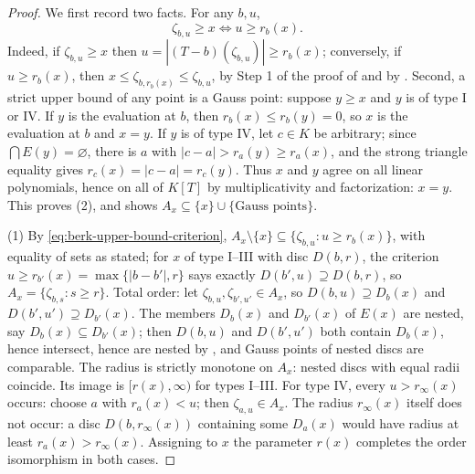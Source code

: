 \begin{proof}
We first record two facts.  For any $b,u$,
\begin{equation}
 \zeta_{b,u}\geq x
 \iff u\geq r_b(x).
 \tag{4.1}\label{eq:berk-upper-bound-criterion}
\end{equation}
Indeed, if $\zeta_{b,u}\geq x$ then
$u=|(T-b)(\zeta_{b,u})|\geq r_b(x)$; conversely, if
$u\geq r_b(x)$, then
$x\leq\zeta_{b,r_b(x)}\leq\zeta_{b,u}$, by Step 1 of the proof of
 and by
.  Second, a strict upper bound of
any point is a Gauss point: suppose $y\geq x$ and $y$ is of type I
or IV.  If $y$ is the evaluation at $b$, then
$r_b(x)\leq r_b(y)=0$, so $x$ is the evaluation at $b$ and
$x=y$.  If $y$ is of type IV, let $c\in K$ be arbitrary; since
$\bigcap E(y)=\varnothing$, there is $a$ with
$|c-a|>r_a(y)\geq r_a(x)$, and the strong triangle equality gives
$r_c(x)=|c-a|=r_c(y)$.  Thus $x$ and $y$ agree on all linear
polynomials, hence on all of $K[T]$ by multiplicativity and
factorization: $x=y$.  This proves (2), and shows
$A_x\subseteq\{x\}\cup\{\text{Gauss points}\}$.

(1) By \eqref{eq:berk-upper-bound-criterion},
$A_x\setminus\{x\}\subseteq\{\zeta_{b,u}:u\geq r_b(x)\}$, with
equality of sets as stated; for $x$ of type I--III with disc
$D(b,r)$, the criterion $u\geq r_{b'}(x)=\max\{|b-b'|,r\}$ says
exactly $D(b',u)\supseteq D(b,r)$, so
$A_x=\{\zeta_{b,s}:s\geq r\}$.  Total order: let
$\zeta_{b,u},\zeta_{b',u'}\in A_x$, so $D(b,u)\supseteq D_b(x)$
and $D(b',u')\supseteq D_{b'}(x)$.  The members $D_b(x)$ and
$D_{b'}(x)$ of $E(x)$ are nested, say
$D_b(x)\subseteq D_{b'}(x)$; then $D(b,u)$ and $D(b',u')$ both
contain $D_b(x)$, hence intersect, hence are nested by
, and Gauss points of nested discs
are comparable.  The radius is strictly monotone on $A_x$: nested
discs with equal radii coincide.  Its image is
$[r(x),\infty)$ for types I--III.  For type IV, every
$u>r_\infty(x)$ occurs: choose $a$ with $r_a(x)<u$; then
$\zeta_{a,u}\in A_x$.  The radius $r_\infty(x)$ itself does not
occur: a disc $D(b,r_\infty(x))$ containing some $D_a(x)$ would
have radius at least $r_a(x)>r_\infty(x)$.  Assigning to $x$ the
parameter $r(x)$ completes the order isomorphism in both cases.


\end{proof}

